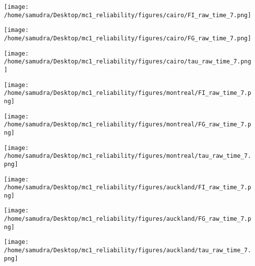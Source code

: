\documentclass[a4paper]{article}
\def\lthtmlcheckvsize{\ifdim\ht\sizebox<\vsize 
  \ifdim\wd\sizebox<\hsize\expandafter\hfill\fi \expandafter\vfill
  \else\expandafter\vss\fi}%
\begin{document}
{\newpage\clearpage
{}%
\texttt{[image: /home/samudra/Desktop/mc1\_reliability/figures/cairo/FI\_raw\_time\_7.png]}%
\lthtmlpictureZ
\lthtmlcheckvsize\clearpage}

{\newpage\clearpage
{}%
\texttt{[image: /home/samudra/Desktop/mc1\_reliability/figures/cairo/FG\_raw\_time\_7.png]}%
\lthtmlpictureZ
\lthtmlcheckvsize\clearpage}

{\newpage\clearpage
{}%
\texttt{[image: /home/samudra/Desktop/mc1\_reliability/figures/cairo/tau\_raw\_time\_7.png]}%
\lthtmlpictureZ
\lthtmlcheckvsize\clearpage}

{\newpage\clearpage
{}%
\texttt{[image: /home/samudra/Desktop/mc1\_reliability/figures/montreal/FI\_raw\_time\_7.png]}%
\lthtmlpictureZ
\lthtmlcheckvsize\clearpage}

{\newpage\clearpage
{}%
\texttt{[image: /home/samudra/Desktop/mc1\_reliability/figures/montreal/FG\_raw\_time\_7.png]}%
\lthtmlpictureZ
\lthtmlcheckvsize\clearpage}

{\newpage\clearpage
{}%
\texttt{[image: /home/samudra/Desktop/mc1\_reliability/figures/montreal/tau\_raw\_time\_7.png]}%
\lthtmlpictureZ
\lthtmlcheckvsize\clearpage}

{\newpage\clearpage
{}%
\texttt{[image: /home/samudra/Desktop/mc1\_reliability/figures/auckland/FI\_raw\_time\_7.png]}%
\lthtmlpictureZ
\lthtmlcheckvsize\clearpage}

{\newpage\clearpage
{}%
\texttt{[image: /home/samudra/Desktop/mc1\_reliability/figures/auckland/FG\_raw\_time\_7.png]}%
\lthtmlpictureZ
\lthtmlcheckvsize\clearpage}

{\newpage\clearpage
{}%
\texttt{[image: /home/samudra/Desktop/mc1\_reliability/figures/auckland/tau\_raw\_time\_7.png]}%
\lthtmlpictureZ
\lthtmlcheckvsize\clearpage}
\end{document}
